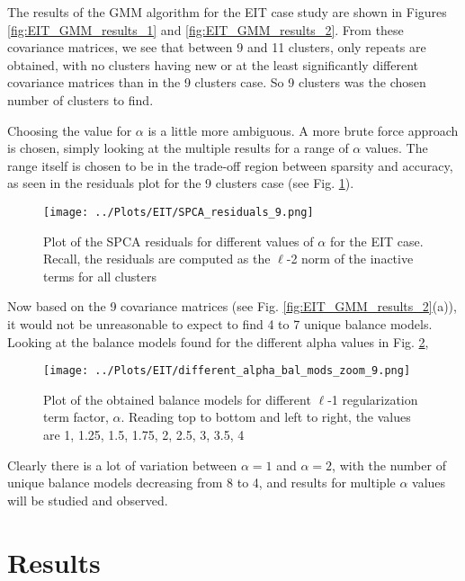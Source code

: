 \documentclass[12pt]{report} %
\begin{document}
The results of the GMM algorithm for the EIT case study are shown in Figures \ref{fig:EIT_GMM_results_1} and \ref{fig:EIT_GMM_results_2}. From these covariance matrices, we see that between 9 and 11 clusters, only repeats are obtained, with no clusters having new or at the least significantly different covariance matrices than in the 9 clusters case. So 9 clusters was the chosen number of clusters to find.

Choosing the value for $\alpha$ is a little more ambiguous. A more brute force approach is chosen, simply looking at the multiple results for a range of $\alpha$ values. The range itself is chosen to be in the trade-off region between sparsity and accuracy, as seen in the residuals plot for the 9 clusters case (see Fig. \ref{fig:EIT_spca_residuals}).


\begin{figure}[htbp]
  \centering
  \texttt{[image: ../Plots/EIT/SPCA\_residuals\_9.png]}
  \caption{Plot of the SPCA residuals for different values of $\alpha$ for the EIT case. Recall, the residuals are computed as the $\ell$-2 norm of the inactive terms for all clusters}
  \label{fig:EIT_spca_residuals}
\end{figure}

Now based on the 9 covariance matrices (see Fig. \ref{fig:EIT_GMM_results_2}(a)), it would not be unreasonable to expect to find 4 to 7 unique balance models. Looking at the balance models found for the different alpha values in Fig. \ref{fig:EIT_diff_alpha},

\begin{figure}[htbp]
  \centering
  \texttt{[image: ../Plots/EIT/different\_alpha\_bal\_mods\_zoom\_9.png]}
  \caption{Plot of the obtained balance models for different $\ell$-1 regularization term factor, $\alpha$. Reading top to bottom and left to right, the values are 1, 1.25, 1.5, 1.75, 2, 2.5, 3, 3.5, 4}
  \label{fig:EIT_diff_alpha}
\end{figure}

Clearly there is a lot of variation between $\alpha =1$ and $\alpha = 2$, with the number of unique balance models decreasing from 8 to 4, and results for multiple $\alpha$ values will be studied and observed.

\newpage

\section{Results}
\end{document}
